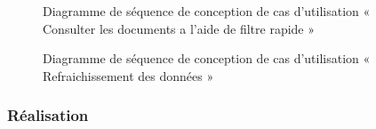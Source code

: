 \begin{figure}[H]
  \centering
  \caption{Diagramme de séquence de conception de cas d'utilisation « Consulter les documents a l'aide de filtre rapide »}
  \label{fig:sequence_conception_consulter_documents_filtre_rapide}
\end{figure}

\begin{figure}[H]
  \centering
  \caption{Diagramme de séquence de conception de cas d'utilisation « Refraichissement des données »}
  \label{fig:sequence_conception_refraichissement_donnees}
\end{figure}

\subsubsection{Réalisation}


